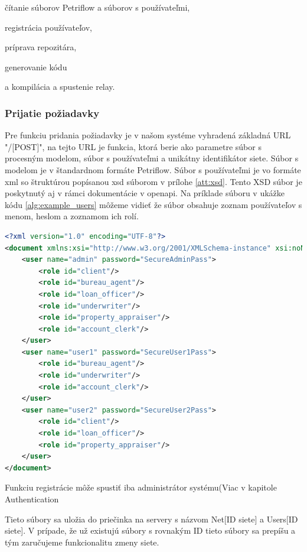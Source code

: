čítanie súborov Petriflow a súborov s používateľmi,  

registrácia používateľov, 

príprava repozitára, 

generovanie kódu  

a kompilácia a spustenie relay. 



\subsubsection{Prijatie požiadavky} 
Pre funkciu pridania požiadavky je v našom systéme vyhradená základná URL "/[POST]", na tejto URL je funkcia, ktorá berie ako parametre súbor s procesným modelom, súbor s používateľmi a unikátny identifikátor siete. Súbor s modelom je v štandardnom formáte Petriflow. Súbor s používateľmi je vo formáte \acrshort{xml} so štruktúrou popísanou \acrshort{xsd} súborom v prílohe \ref{att:xsd}. Tento XSD súbor je poskytnutý aj v rámci dokumentácie v \acrshort{openapi}. Na príklade súboru v ukážke kódu \ref{alg:example_users} môžeme vidieť že súbor obsahuje zoznam používateľov s menom, heslom a zoznamom ich rolí. 



\begin{lstlisting}[float, caption={Príklad súboru s používateľmi},label={alg:example_users},language=XML] 
<?xml version="1.0" encoding="UTF-8"?> 
<document xmlns:xsi="http://www.w3.org/2001/XMLSchema-instance" xsi:noNamespaceSchemaLocation="./users_schema.xsd"> 
	<user name="admin" password="SecureAdminPass"> 
		<role id="client"/> 
		<role id="bureau_agent"/> 
		<role id="loan_officer"/> 
		<role id="underwriter"/> 
		<role id="property_appraiser"/> 
		<role id="account_clerk"/> 
	</user> 
	<user name="user1" password="SecureUser1Pass"> 
		<role id="bureau_agent"/> 
		<role id="underwriter"/> 
		<role id="account_clerk"/> 
	</user> 
	<user name="user2" password="SecureUser2Pass"> 
		<role id="client"/> 
		<role id="loan_officer"/> 
		<role id="property_appraiser"/> 
	</user> 
</document> 
\end{lstlisting} 

Funkciu registrácie môže spustiť iba administrátor systému(Viac v kapitole Authentication %

Tieto súbory sa uložia do priečinka na servery s názvom Net[ID siete] a Users[ID siete]. V prípade, že už existujú súbory s rovnakým ID tieto súbory sa prepíšu a tým zaručujeme funkcionalitu zmeny siete.  

